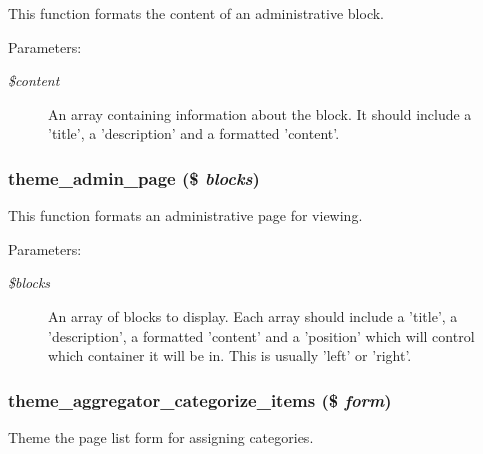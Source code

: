 This function formats the content of an administrative block.

\begin{Desc}
\item[Parameters:]
\begin{description}
\item[{\em \$content}]An array containing information about the block. It should include a 'title', a 'description' and a formatted 'content'. \end{description}
\end{Desc}
\hypertarget{group__themeable_g397a84152a61e9517d530d8f8a2507ee}{
\subsubsection[{theme\_\-admin\_\-page}]{\setlength{\rightskip}{0pt plus 5cm}theme\_\-admin\_\-page (\$ {\em blocks})}}
\label{group__themeable_g397a84152a61e9517d530d8f8a2507ee}


This function formats an administrative page for viewing.

\begin{Desc}
\item[Parameters:]
\begin{description}
\item[{\em \$blocks}]An array of blocks to display. Each array should include a 'title', a 'description', a formatted 'content' and a 'position' which will control which container it will be in. This is usually 'left' or 'right'. \end{description}
\end{Desc}
\hypertarget{group__themeable_gd4db01ba5914e1aba833f470ac41e184}{
\subsubsection[{theme\_\-aggregator\_\-categorize\_\-items}]{\setlength{\rightskip}{0pt plus 5cm}theme\_\-aggregator\_\-categorize\_\-items (\$ {\em form})}}
\label{group__themeable_gd4db01ba5914e1aba833f470ac41e184}


Theme the page list form for assigning categories.

